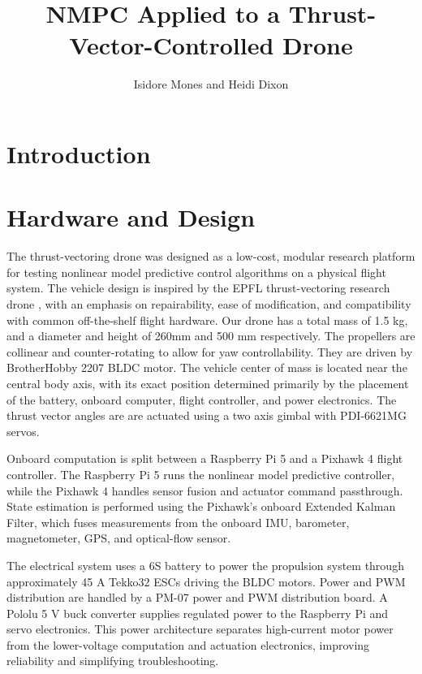 \documentclass[]{article}
\title{NMPC Applied to a Thrust-Vector-Controlled Drone}
\author{Isidore Mones and Heidi Dixon}
\begin{document}
\maketitle

\section*{Introduction}

\section*{Hardware and Design}

The thrust-vectoring drone was designed as a low-cost, modular research platform for testing nonlinear model predictive control algorithms on a physical flight system. The vehicle design is inspired by the EPFL thrust-vectoring research drone \cite{TVCDrone}, with an emphasis on repairability, ease of modification, and compatibility with common off-the-shelf flight hardware.
Our drone has a total mass of 1.5 kg, and a diameter and height of 260mm and 500 mm respectively.
The propellers are collinear and counter-rotating to allow for yaw controllability. They are driven by BrotherHobby 2207 BLDC motor. The vehicle center of mass is located near the central body axis, with its exact position determined primarily by the placement of the battery, onboard computer, flight controller, and power electronics. The thrust vector angles are are actuated using a two axis gimbal with PDI-6621MG servos.

Onboard computation is split between a Raspberry Pi 5 and a Pixhawk 4 flight controller. The Raspberry Pi 5 runs the nonlinear model predictive controller, while the Pixhawk 4 handles sensor fusion and actuator command passthrough. State estimation is performed using the Pixhawk’s onboard Extended Kalman Filter, which fuses measurements from the onboard IMU, barometer, magnetometer, GPS, and optical-flow sensor.

The electrical system uses a 6S battery to power the propulsion system through approximately 45 A Tekko32 ESCs driving the BLDC motors. Power and PWM distribution are handled by a PM-07 power and PWM distribution board. A Pololu 5 V buck converter supplies regulated power to the Raspberry Pi and servo electronics. This power architecture separates high-current motor power from the lower-voltage computation and actuation electronics, improving reliability and simplifying troubleshooting.
\end{document}
